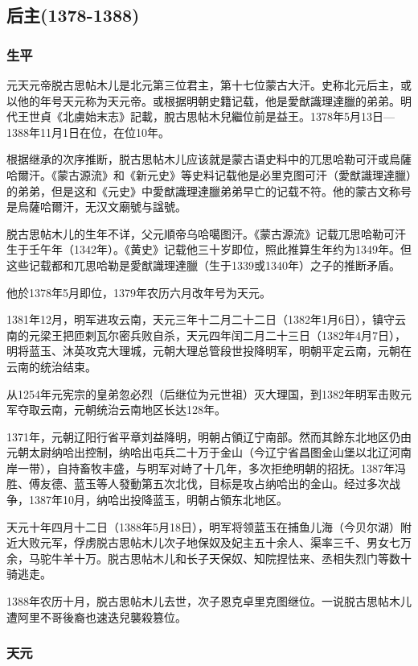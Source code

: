 \subsection{后主\tiny(1378-1388)}

\subsubsection{生平}

元天元帝脱古思帖木儿是北元第三位君主，第十七位蒙古大汗。史称北元后主，或以他的年号天元称为天元帝。或根据明朝史籍记载，他是愛猷識理達臘的弟弟。明代王世貞《北虜始末志》記載，脫古思帖木兒繼位前是益王。1378年5月13日—1388年11月1日在位，在位10年。

根据继承的次序推断，脱古思帖木儿应该就是蒙古语史料中的兀思哈勒可汗或烏薩哈爾汗。《蒙古源流》和《新元史》等史料记载他是必里克图可汗（愛猷識理達臘）的弟弟，但是这和《元史》中愛猷識理達臘弟弟早亡的记载不符。他的蒙古文称号是烏薩哈爾汗，无汉文廟號与諡號。

脱古思帖木儿的生年不详，父元順帝乌哈噶图汗。《蒙古源流》记载兀思哈勒可汗生于壬午年（1342年）。《黄史》记载他三十岁即位，照此推算生年约为1349年。但这些记载都和兀思哈勒是愛猷識理達臘（生于1339或1340年）之子的推断矛盾。

他於1378年5月即位，1379年农历六月改年号为天元。

1381年12月，明军进攻云南，天元三年十二月二十二日（1382年1月6日），镇守云南的元梁王把匝剌瓦尔密兵败自杀，天元四年闰二月二十三日（1382年4月7日），明将蓝玉、沐英攻克大理城，元朝大理总管段世投降明军，明朝平定云南，元朝在云南的统治结束。

从1254年元宪宗的皇弟忽必烈（后继位为元世祖）灭大理国，到1382年明军击败元军夺取云南，元朝统治云南地区长达128年。

1371年，元朝辽阳行省平章刘益降明，明朝占領辽宁南部。然而其餘东北地区仍由元朝太尉纳哈出控制，纳哈出屯兵二十万于金山（今辽宁省昌图金山堡以北辽河南岸一带），自持畜牧丰盛，与明军对峙了十几年，多次拒绝明朝的招抚。1387年冯胜、傅友德、蓝玉等人發動第五次北伐，目标是攻占纳哈出的金山。经过多次战争，1387年10月，纳哈出投降蓝玉，明朝占領东北地区。

天元十年四月十二日（1388年5月18日），明军将领蓝玉在捕鱼儿海（今贝尔湖）附近大败元军，俘虏脱古思帖木儿次子地保奴及妃主五十余人、渠率三千、男女七万余，马驼牛羊十万。脱古思帖木儿和长子天保奴、知院捏怯来、丞相失烈门等数十骑逃走。

1388年农历十月，脱古思帖木儿去世，次子恩克卓里克图继位。一说脱古思帖木儿遭阿里不哥後裔也速迭兒襲殺篡位。

\subsubsection{天元}

